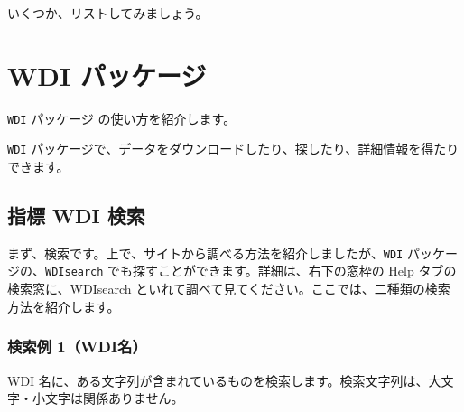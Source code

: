 \documentclass[
  xelatex, ja=standard]{bxjsbook}
\theoremstyle{definition}
\theoremstyle{definition}
\theoremstyle{definition}
\theoremstyle{definition}
\theoremstyle{remark}
\begin{document}
いくつか、リストしてみましょう。

\hypertarget{wdi-ux30d1ux30c3ux30b1ux30fcux30b8}{%
\section{WDI パッケージ}\label{wdi-ux30d1ux30c3ux30b1ux30fcux30b8}}

\texttt{WDI} パッケージ の使い方を紹介します。

\texttt{WDI} パッケージで、データをダウンロードしたり、探したり、詳細情報を得たりできます。

\hypertarget{ux6307ux6a19-wdi-ux691cux7d22}{%
\subsection{指標 WDI 検索}\label{ux6307ux6a19-wdi-ux691cux7d22}}

まず、検索です。上で、サイトから調べる方法を紹介しましたが、\texttt{WDI} パッケージの、\texttt{WDIsearch} でも探すことができます。詳細は、右下の窓枠の Help タブの検索窓に、WDIsearch といれて調べて見てください。ここでは、二種類の検索方法を紹介します。

\hypertarget{ux691cux7d22ux4f8b-1wdiux540d}{%
\subsubsection{検索例 1（WDI名）}\label{ux691cux7d22ux4f8b-1wdiux540d}}

WDI 名に、ある文字列が含まれているものを検索します。検索文字列は、大文字・小文字は関係ありません。
\end{document}
